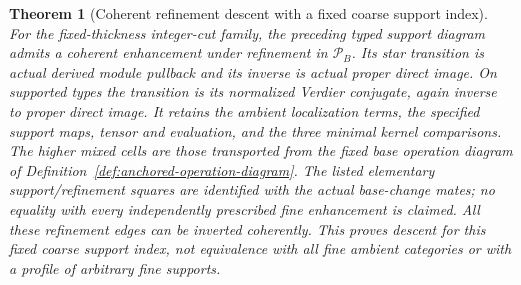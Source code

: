 \documentclass[11pt]{article}
\newtheorem{theorem}{Theorem}[section]
\theoremstyle{definition}
\theoremstyle{remark}
\begin{document}
\begin{theorem}[Coherent refinement descent with a fixed coarse support index]
\label{thm:anchored-coherent-descent}
For the fixed-thickness integer-cut family, the preceding typed support
diagram admits a coherent enhancement under refinement in $\mathcal P_B$.
Its star transition is actual derived module pullback and its inverse
is actual proper direct image.  On supported types the transition is
its normalized Verdier conjugate, again inverse to proper direct image.
It retains the ambient localization terms, the specified support maps,
tensor and evaluation, and the three minimal kernel comparisons.
The higher mixed cells are those transported from the fixed base
operation diagram of Definition~\ref{def:anchored-operation-diagram}.
The listed elementary support/refinement squares are identified with
the actual base-change mates; no equality with every independently
prescribed fine enhancement is claimed.
All these refinement edges can be inverted coherently.  This proves
descent for this fixed coarse support index, not equivalence with all
fine ambient categories or with a profile of arbitrary fine supports.
\end{theorem}
\end{document}
